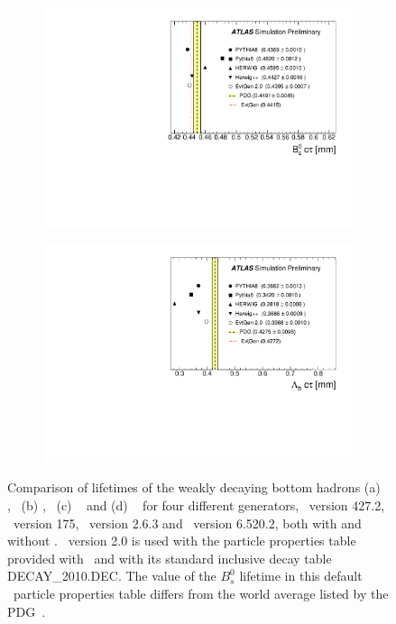 \begin{figure}
\begin{subfigure}[]{0.45\textwidth}
\end{subfigure}
\begin{subfigure}[]{0.45\textwidth}
\includegraphics[width=\textwidth]{evtgen/figures/EvtGen/h_Bs_life.pdf}
\end{subfigure}
\begin{subfigure}[]{0.45\textwidth}
\includegraphics[width=\textwidth]{evtgen/figures/EvtGen/h_Lambdab_life.pdf}
\end{subfigure}
\caption{Comparison of lifetimes of the weakly decaying bottom hadrons 
(a) \Bo,~ (b) \Bp,~ (c) \Bs~ and (d) \Lb~
for four different generators,
\Pythia\ version 427.2, \PythiaE\ version 175, \Herwigpp\  version 2.6.3 and \Herwig\ version 6.520.2, 
both with and without
\EvtGen.  
\EvtGen\ version 2.0 is used with the particle properties table provided with \EvtGen\ and with 
its standard inclusive decay table DECAY\_2010.DEC.
The value of the $B_s^0$ lifetime in this default \EvtGen\ particle properties table 
differs from the world average listed by the PDG~\cite{PhysRevD.86.010001}.}
\label{fig:blife}
\end{figure}

